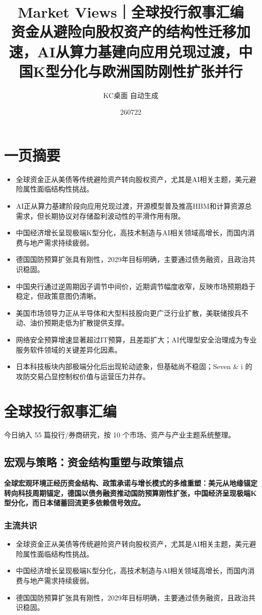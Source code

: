 \documentclass[11pt]{ctexart}
\title{\textbf{Market Views｜全球投行叙事汇编}\\[0.4em]{\large 资金从避险向股权资产的结构性迁移加速，AI从算力基建向应用兑现过渡，中国K型分化与欧洲国防刚性扩张并行}}
\author{KC桌面 自动生成}
\date{260722}
\begin{document}
\maketitle
\tableofcontents
\newpage
\section{一页摘要}
\begin{itemize}
  \item 全球资金正从美债等传统避险资产转向股权资产，尤其是AI相关主题，美元避险属性面临结构性挑战。
  \item AI正从算力基建阶段向应用兑现过渡，开源模型普及推高HBM和计算资源总需求，但长期协议对存储盈利波动性的平滑作用有限。
  \item 中国经济增长呈现极端K型分化，高技术制造与AI相关领域高增长，而国内消费与地产需求持续疲弱。
  \item 德国国防预算扩张具有刚性，2029年目标明确，主要通过债务融资，且政治共识稳固。
  \item 中国央行通过逆周期因子调节中间价，近期调节幅度收窄，反映市场预期趋于稳定，但政策意图仍清晰。
  \item 美国市场领导力正从半导体和大型科技股向更广泛行业扩散，美联储按兵不动、油价预期走低为扩散提供支撑。
  \item 网络安全预算增速显著超过IT预算，且差距扩大；AI代理型安全治理成为专业服务软件领域的关键差异化因素。
  \item 日本科技板块内部极端分化后出现轮动迹象，但基础尚不稳固；Seven \& i 的攻防交易凸显控制权价值与运营压力并存。
\end{itemize}
\section{全球投行叙事汇编}
今日纳入 55 篇投行/券商研究，按 10 个市场、资产与产业主题系统整理。
\newpage
\subsection{宏观与策略：资金结构重塑与政策锚点}
\textbf{全球宏观环境正经历资金结构、政策承诺与增长模式的多维重塑：美元从地缘锚定转向科技周期锚定，德国以债务融资推动国防预算刚性扩张，中国经济呈现极端K型分化，而日本储蓄回流更多依赖信号效应。}
\subsubsection*{主流共识}
\begin{itemize}
  \item 全球资金正从美债等传统避险资产转向股权资产，尤其是AI相关主题，美元避险属性面临结构性挑战。
  \item 中国经济增长呈现极端K型分化，高技术制造与AI相关领域高增长，而国内消费与地产需求持续疲弱。
  \item 德国国防预算扩张具有刚性，2029年目标明确，主要通过债务融资，且政治共识稳固。
\end{itemize}
\end{document}
